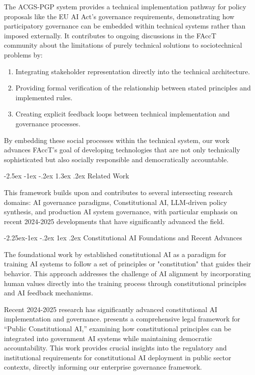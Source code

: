 \documentclass[manuscript,screen,9pt]{acmart}
\makeatletter
\renewcommand\section{\@startsection{section}{1}{\z@}%
  {-2.5ex \@plus -1ex \@minus -.2ex}%
  {1.3ex \@plus.2ex}%
  {\normalfont\Large\bfseries}}
\renewcommand\subsection{\@startsection{subsection}{2}{\z@}%
  {-2.25ex\@plus -1ex \@minus -.2ex}%
  {1ex \@plus .2ex}%
  {\normalfont\large\bfseries}}
\makeatother
\begin{document}
The ACGS-PGP system provides a technical implementation pathway for policy proposals like the EU AI Act's governance requirements, demonstrating how participatory governance can be embedded within technical systems rather than imposed externally. It contributes to ongoing discussions in the FAccT community about the limitations of purely technical solutions to sociotechnical problems by:
\begin{enumerate}[leftmargin=*,itemsep=1pt,parsep=1pt]
    \item Integrating stakeholder representation directly into the technical architecture.
    \item Providing formal verification of the relationship between stated principles and implemented rules.
    \item Creating explicit feedback loops between technical implementation and governance processes.
\end{enumerate}
By embedding these social processes within the technical system, our work advances FAccT's goal of developing technologies that are not only technically sophisticated but also socially responsible and democratically accountable.

\FloatBarrier %
\section{Related Work}
\label{sec:related_work}

This framework builds upon and contributes to several intersecting research domains: AI governance paradigms, Constitutional AI, LLM-driven policy synthesis, and production AI system governance, with particular emphasis on recent 2024-2025 developments that have significantly advanced the field.

\subsection{Constitutional AI Foundations and Recent Advances}

The foundational work by \citet{Bai2025ConstitutionalAI} established constitutional AI as a paradigm for training AI systems to follow a set of principles or "constitution" that guides their behavior. This approach addresses the challenge of AI alignment by incorporating human values directly into the training process through constitutional principles and AI feedback mechanisms.

Recent 2024-2025 research has significantly advanced constitutional AI implementation and governance. \citet{Abiri2025PublicConstitutional} presents a comprehensive legal framework for ``Public Constitutional AI,'' examining how constitutional principles can be integrated into government AI systems while maintaining democratic accountability. This work provides crucial insights into the regulatory and institutional requirements for constitutional AI deployment in public sector contexts, directly informing our enterprise governance framework.
\end{document}
